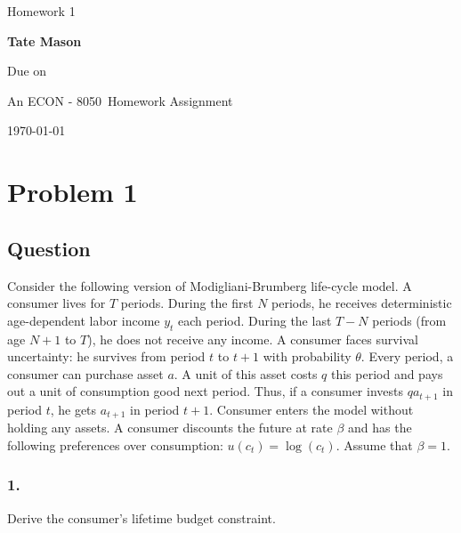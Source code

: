 \documentclass[10pt, a4paper]{article}
\newcommand\course{ECON - 8050}
\newcommand\hwnumber{1}
\newcommand\Information{Tate Mason}
\begin{document}
  \begin{titlepage}
    \begin{center}
      \vspace*{3cm}
            
      \vspace{1cm}
      \huge
      Homework \hwnumber
            
      \vspace{1.5cm}
      \Large
            
      \textbf{\Information}
            
      \vfill
      
      \vspace{1cm}
      
      Due on 

      \vspace{1cm}

      An \course \ Homework Assignment
            
      \vspace{1cm}
      \Large
      
      \today
            
    \end{center}
  \end{titlepage}
  \section*{Problem 1}
  \subsection*{Question}
    Consider the following version of Modigliani-Brumberg life-cycle model. A consumer lives for $T$ periods. During the first $N$ periods, he receives deterministic age-dependent labor income $y_t$ each period. During the last $T-N$ periods (from age $N+1$ to $T$), he does not receive any income. A consumer faces survival uncertainty: he survives from period $t$ to $t+1$ with probability $\theta$. Every period, a consumer can purchase asset $a$. A unit of this asset costs $q$ this period and pays out a unit of consumption good next period. Thus, if a consumer invests $qa_{t+1}$ in period $t$, he gets $a_{t+1}$ in period $t+1$. Consumer enters the model without holding any assets. A consumer discounts the future at rate $\beta$ and has the following preferences over consumption: $u(c_t) = \log(c_t)$. Assume that $\beta=1$.
    \subsubsection*{1.}
      Derive the consumer's lifetime budget constraint.
\end{document}
